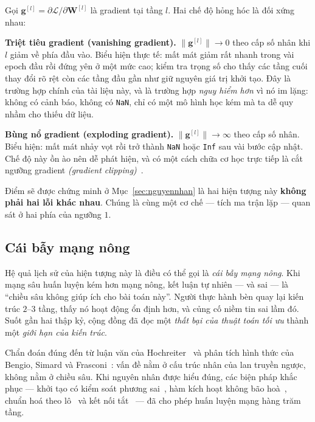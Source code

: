 Gọi $\boldsymbol{g}^{[l]} = \partial\mathcal{L}/\partial \mathbf{W}^{[l]}$ là
gradient tại tầng $l$. Hai chế độ hỏng hóc là đối xứng nhau:

\textbf{Triệt tiêu gradient (vanishing gradient).} $\|\boldsymbol{g}^{[l]}\|
\to 0$ theo cấp số nhân khi $l$ giảm về phía đầu vào. Biểu hiện thực tế: mất mát
giảm rất nhanh trong vài epoch đầu rồi đứng yên ở một mức cao; kiểm tra trọng số
cho thấy các tầng cuối thay đổi rõ rệt còn các tầng đầu gần như giữ nguyên giá
trị khởi tạo. Đây là trường hợp chính của tài liệu này, và là trường hợp
\emph{nguy hiểm hơn} vì nó im lặng: không có cảnh báo, không có \texttt{NaN},
chỉ có một mô hình học kém mà ta dễ quy nhầm cho thiếu dữ liệu.

\textbf{Bùng nổ gradient (exploding gradient).} $\|\boldsymbol{g}^{[l]}\|
\to \infty$ theo cấp số nhân. Biểu hiện: mất mát nhảy vọt rồi trở thành
\texttt{NaN} hoặc \texttt{Inf} sau vài bước cập nhật. Chế độ này ồn ào nên dễ
phát hiện, và có một cách chữa cơ học trực tiếp là cắt ngưỡng gradient
\emph{(gradient clipping)}~\cite{Pascanu2013}.

Điểm sẽ được chứng minh ở Mục~\ref{sec:nguyennhan} là hai hiện tượng này
\textbf{không phải hai lỗi khác nhau}. Chúng là cùng một cơ chế --- tích ma trận
lặp --- quan sát ở hai phía của ngưỡng $1$.

\subsection{Cái bẫy mạng nông}

Hệ quả lịch sử của hiện tượng này là điều có thể gọi là \emph{cái bẫy mạng nông}.
Khi mạng sâu huấn luyện kém hơn mạng nông, kết luận tự nhiên --- và sai --- là
``chiều sâu không giúp ích cho bài toán này''. Người thực hành bèn quay lại kiến
trúc $2$--$3$ tầng, thấy nó hoạt động ổn định hơn, và củng cố niềm tin sai lầm
đó. Suốt gần hai thập kỷ, cộng đồng đã đọc một \emph{thất bại của thuật toán tối
ưu} thành một \emph{giới hạn của kiến trúc}.

Chẩn đoán đúng đến từ luận văn của Hochreiter~\cite{Hochreiter1991} và phân tích
hình thức của Bengio, Simard và Frasconi~\cite{BengioSimardFrasconi1994}: vấn đề
nằm ở cấu trúc nhân của lan truyền ngược, không nằm ở chiều sâu. Khi nguyên nhân
được hiểu đúng, các biện pháp khắc phục --- khởi tạo có kiểm soát phương
sai~\cite{GlorotBengio2010,He2015}, hàm kích hoạt không bão
hoà~\cite{He2015}, chuẩn hoá theo lô~\cite{IoffeSzegedy2015} và kết nối
tắt~\cite{He2016ResNet} --- đã cho phép huấn luyện mạng hàng trăm tầng.


